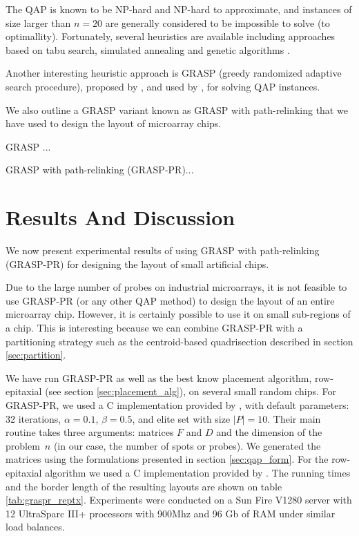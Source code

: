 \documentclass{bioinfo}
\begin{document}
The QAP is known to be NP-hard and NP-hard to approximate, and instances of size larger than $n = 20$ are generally considered to be impossible to solve (to optimallity). Fortunately, several heuristics are available including approaches based on tabu search, simulated annealing and genetic algorithms \citep{CELA98}.

Another interesting heuristic approach is GRASP (greedy randomized adaptive search procedure), proposed by \citealp{FEO95}, and used by \citealp{LI94}, for solving QAP instances.

We also outline a GRASP variant known as GRASP with path-relinking \citep{OLIVEIRA04} that we have used to design the layout of microarray chips.

GRASP ...

GRASP with path-relinking (GRASP-PR)...

\section{Results And Discussion}
\label{sec:results}

We now present experimental results of using GRASP with path-relinking (GRASP-PR) for designing the layout of small artificial chips.

Due to the large number of probes on industrial microarrays, it is not feasible to use GRASP-PR (or any other QAP method) to design the layout of an entire microarray chip. However, it is certainly possible to use it on small sub-regions of a chip. This is interesting because we can combine GRASP-PR with a partitioning strategy such as the centroid-based quadrisection described in section \ref{sec:partition}.

We have run GRASP-PR as well as the best know placement algorithm, row-epitaxial (see section \ref{sec:placement_alg}), on several small random chips. For GRASP-PR, we used a C implementation provided by \citealp{OLIVEIRA04}, with default parameters: 32 iterations, $\alpha=0.1$, $\beta=0.5$, and elite set with size $\mid P\mid = 10$. Their main routine takes three arguments: matrices $F$ and $D$ and the dimension of the problem~$n$ (in our case, the number of spots or probes). We generated the matrices using the formulations presented in section \ref{sec:qap_form}. For the row-epitaxial algorithm we used a C implementation provided by \citealp{KAHNG03A}. The running times and the border length of the resulting layouts are shown on table \ref{tab:graspr_reptx}. Experiments were conducted on a Sun Fire V1280 server with 12 UltraSparc III+ processors with 900Mhz and 96 Gb of RAM under similar load balances.
\end{document}
